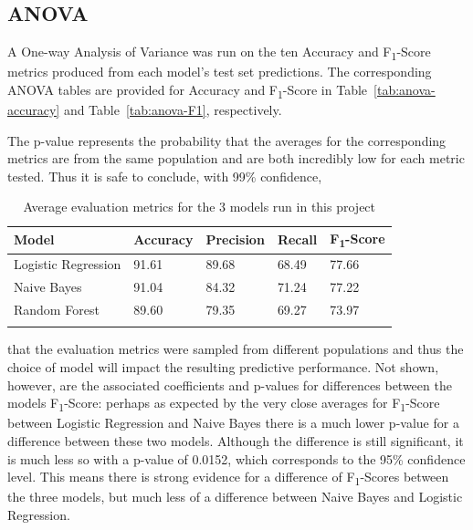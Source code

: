\documentclass[12pt,letterpaper, oneside]
{article}
\begin{document}
\subsection{ANOVA}
A One-way Analysis of Variance was run on the ten Accuracy and F\textsubscript{1}-Score metrics produced from each model's test set predictions. The corresponding ANOVA tables are provided for Accuracy and F\textsubscript{1}-Score in Table~\ref{tab:anova-accuracy} and Table~\ref{tab:anova-F1}, respectively.

The p-value represents the probability that the averages for the corresponding metrics are from the same population and are both incredibly low for each metric tested. Thus it is safe to conclude, with 99\% confidence,

\begin{table}
	\begin{tabular}{l l l l l} \toprule
		Model & Accuracy & Precision & Recall & F\textsubscript{1}-Score \\ \midrule
		Logistic Regression & 91.61 & 89.68 & 68.49 & 77.66 \\
		Naive Bayes & 91.04 & 84.32 & 71.24 & 77.22 \\
		Random Forest & 89.60 & 79.35 & 69.27 & 73.97 \\
		\caption{Average evaluation metrics for the 3 models run in this project
			\label{tab:3model-ave}
		}
	\end{tabular}

\end{table}

\noindent that the evaluation metrics were sampled from different populations and thus the choice of model will impact the resulting predictive performance. Not shown, however, are the associated coefficients and p-values for differences between the models F\textsubscript{1}-Score: perhaps as expected by the very close averages for F\textsubscript{1}-Score between Logistic Regression and Naive Bayes there is a much lower p-value for a difference between these two models. Although the difference is still significant, it is much less so with a p-value of 0.0152, which corresponds to the 95\% confidence level. This means there is strong evidence for a difference of F\textsubscript{1}-Scores between the three models, but much less of a difference between Naive Bayes and Logistic Regression.
\end{document}
